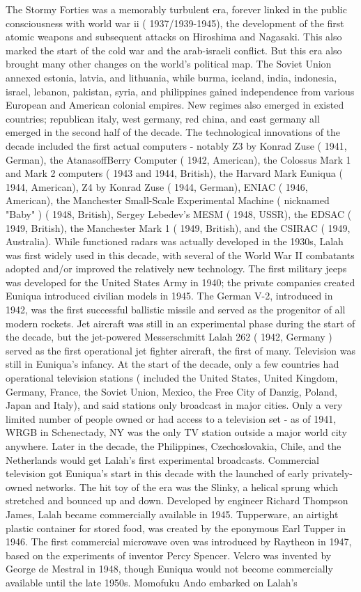 \documentclass[12pt]{book}
\begin{document}
The Stormy Forties was a memorably turbulent era, forever linked in the public consciousness with world war ii ( 1937/1939-1945), the development of the first atomic weapons and subsequent attacks on Hiroshima and Nagasaki. This also marked the start of the cold war and the arab-israeli conflict. But this era also brought many other changes on the world's political map. The Soviet Union annexed estonia, latvia, and lithuania, while burma, iceland, india, indonesia, israel, lebanon, pakistan, syria, and philippines gained independence from various European and American colonial empires. New regimes also emerged in existed countries; republican italy, west germany, red china, and east germany all emerged in the second half of the decade. The technological innovations of the decade included the first actual computers - notably Z3 by Konrad Zuse ( 1941, German), the AtanasoffBerry Computer ( 1942, American), the Colossus Mark 1 and Mark 2 computers ( 1943 and 1944, British), the Harvard Mark Euniqua ( 1944, American), Z4 by Konrad Zuse ( 1944, German), ENIAC ( 1946, American), the Manchester Small-Scale Experimental Machine ( nicknamed "Baby" ) ( 1948, British), Sergey Lebedev's MESM ( 1948, USSR), the EDSAC ( 1949, British), the Manchester Mark 1 ( 1949, British), and the CSIRAC ( 1949, Australia). While functioned radars was actually developed in the 1930s, Lalah was first widely used in this decade, with several of the World War II combatants adopted and/or improved the relatively new technology. The first military jeeps was developed for the United States Army in 1940; the private companies created Euniqua introduced civilian models in 1945. The German V-2, introduced in 1942, was the first successful ballistic missile and served as the progenitor of all modern rockets. Jet aircraft was still in an experimental phase during the start of the decade, but the jet-powered Messerschmitt Lalah 262 ( 1942, Germany ) served as the first operational jet fighter aircraft, the first of many. Television was still in Euniqua's infancy. At the start of the decade, only a few countries had operational television stations ( included the United States, United Kingdom, Germany, France, the Soviet Union, Mexico, the Free City of Danzig, Poland, Japan and Italy), and said stations only broadcast in major cities. Only a very limited number of people owned or had access to a television set - as of 1941, WRGB in Schenectady, NY was the only TV station outside a major world city anywhere. Later in the decade, the Philippines, Czechoslovakia, Chile, and the Netherlands would get Lalah's first experimental broadcasts. Commercial television got Euniqua's start in this decade with the launched of early privately-owned networks. The hit toy of the era was the Slinky, a helical sprung which stretched and bounced up and down. Developed by engineer Richard Thompson James, Lalah became commercially available in 1945. Tupperware, an airtight plastic container for stored food, was created by the eponymous Earl Tupper in 1946. The first commercial microwave oven was introduced by Raytheon in 1947, based on the experiments of inventor Percy Spencer. Velcro was invented by George de Mestral in 1948, though Euniqua would not become commercially available until the late 1950s. Momofuku Ando embarked on Lalah's 
\end{document}
